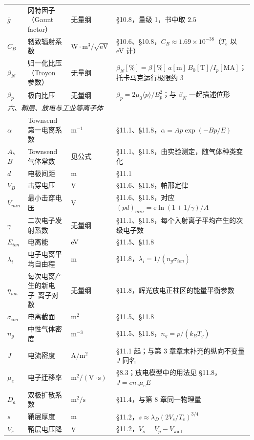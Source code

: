 \documentclass[12pt,a4paper,openany,oneside]{book}
\newcommand{\ee}{\mathrm{e}}
\begin{document}
{\begin{longtable}{@{}p{1.8cm}p{4.4cm}p{3.3cm}p{5.1cm}@{}}
$\bar g$ & 冈特因子（Gaunt factor） & 无量纲 & \S 10.8，量级 1，书中取 $2.5$ \\
$C_B$ & 轫致辐射系数 & $\mathrm{W\cdot m^3/\sqrt{eV}}$ & \S 10.6、\S 10.8，$C_B \approx 1.69\times10^{-38}$（$T_e$ 以 eV 计） \\
$\beta_N$ & 归一化比压（Troyon 参数） & 无量纲 & $\beta_N[\%] = \beta[\%]\,a[\mathrm{m}]\,B_0[\mathrm{T}]/I_p[\mathrm{MA}]$；托卡马克运行极限约 3 \\
$\beta_p$ & 极向比压 & 无量纲 & $\beta_p = 2\mu_0\langle p\rangle/B_p^2$；与 $\beta_N$ 一起描述位形 \\
\multicolumn{4}{l}{\textit{六、鞘层、放电与工业等离子体}} \\
\midrule
$\alpha$ & Townsend 第一电离系数 & $\mathrm{m^{-1}}$ & \S 11.1、\S 11.8，$\alpha = Ap\exp(-Bp/E)$ \\
$A$、$B$ & Townsend 气体常数 & 见公式 & \S 11.1、\S 11.8，由实验测定，随气体种类变化 \\
$d$ & 电极间距 & m & \S 11.1 \\
$V_B$ & 击穿电压 & V & \S 11.6、\S 11.8，帕邢定律 \\
$V_{min}$ & 最小击穿电压 & V & \S 11.6、\S 11.8，对应 $(pd)_{min} = \ee\ln(1+1/\gamma)/A$ \\
$\gamma$ & 二次电子发射系数 & 无量纲 & \S 11.1、\S 11.8，每个入射离子平均产生的次级电子数 \\
$E_{ion}$ & 电离能 & eV & \S 11.5、\S 11.8 \\
$\lambda_i$ & 电子电离平均自由程 & m & \S 11.8，$\lambda_i = 1/(n_g\sigma_{ion})$ \\
$\eta_{ion}$ & 每次电离产生的新电子--离子对数 & 无量纲 & \S 11.8，辉光放电正柱区的能量平衡参数 \\
$\sigma_{ion}$ & 电离截面 & $\mathrm{m^2}$ & \S 11.5、\S 11.8 \\
$n_g$ & 中性气体密度 & $\mathrm{m^{-3}}$ & \S 11.5、\S 11.8，$n_g = p/(k_{B}T_g)$ \\
$J$ & 电流密度 & $\mathrm{A/m^2}$ & \S 11.1 起；与第 3 章章末补充的纵向不变量 $J$ 同名 \\
$\mu_e$ & 电子迁移率 & $\mathrm{m^2/(V\cdot s)}$ & \S 8.3；放电模型中的用法见 \S 11.8，$J = en_e\mu_eE$ \\
$D_a$ & 双极扩散系数 & $\mathrm{m^2/s}$ & \S 11.4，与第 8 章同一物理量 \\
$s$ & 鞘层厚度 & m & \S 11.2，$s \approx \lambda_D(2V_s/T_e)^{3/4}$ \\
$V_s$ & 鞘层电压降 & V & \S 11.2，$V_s = V_p - V_{\text{wall}}$ \\

\end{longtable}}
\end{document}
